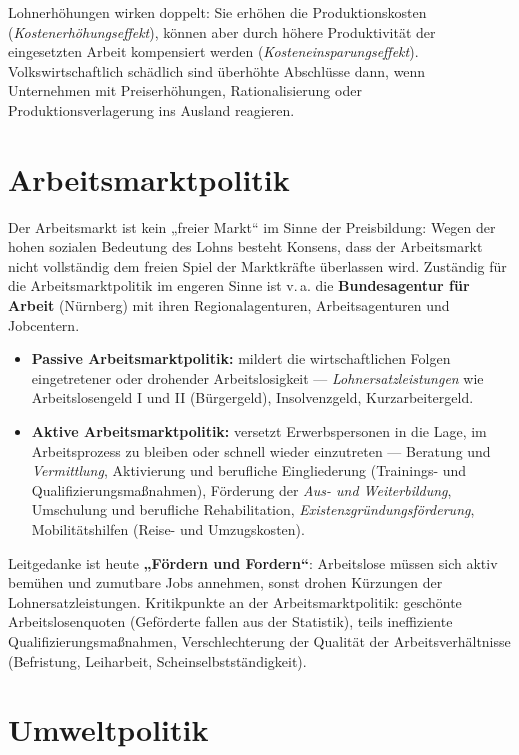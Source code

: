 \documentclass[11pt, a4paper]{article}
\begin{document}
Lohnerhöhungen wirken doppelt: Sie erhöhen die Produktionskosten
(\emph{Kostenerhöhungseffekt}), können aber durch höhere Produktivität der eingesetzten
Arbeit kompensiert werden (\emph{Kosteneinsparungseffekt}). Volkswirtschaftlich schädlich
sind überhöhte Abschlüsse dann, wenn Unternehmen mit Preiserhöhungen, Rationalisierung oder
Produktionsverlagerung ins Ausland reagieren.

\section{Arbeitsmarktpolitik}

Der Arbeitsmarkt ist kein „freier Markt`` im Sinne der Preisbildung: Wegen der hohen
sozialen Bedeutung des Lohns besteht Konsens, dass der Arbeitsmarkt nicht vollständig dem
freien Spiel der Marktkräfte überlassen wird. Zuständig für die Arbeitsmarktpolitik im
engeren Sinne ist v.\,a. die \textbf{Bundesagentur für Arbeit} (Nürnberg) mit ihren
Regionalagenturen, Arbeitsagenturen und Jobcentern.

\begin{itemize}
  \item \textbf{Passive Arbeitsmarktpolitik:} mildert die wirtschaftlichen Folgen
    eingetretener oder drohender Arbeitslosigkeit --- \emph{Lohnersatzleistungen} wie
    Arbeitslosengeld I und II (Bürgergeld), Insolvenzgeld, Kurzarbeitergeld.
  \item \textbf{Aktive Arbeitsmarktpolitik:} versetzt Erwerbspersonen in die Lage, im
    Arbeitsprozess zu bleiben oder schnell wieder einzutreten --- Beratung und
    \emph{Vermittlung}, Aktivierung und berufliche Eingliederung (Trainings- und
    Qualifizierungsmaßnahmen), Förderung der \emph{Aus- und Weiterbildung}, Umschulung und
    berufliche Rehabilitation, \emph{Existenzgründungsförderung}, Mobilitätshilfen (Reise-
    und Umzugskosten).
\end{itemize}

Leitgedanke ist heute \textbf{„Fördern und Fordern``}: Arbeitslose müssen sich aktiv
bemühen und zumutbare Jobs annehmen, sonst drohen Kürzungen der Lohnersatzleistungen.
Kritikpunkte an der Arbeitsmarktpolitik: geschönte Arbeitslosenquoten (Geförderte fallen
aus der Statistik), teils ineffiziente Qualifizierungsmaßnahmen, Verschlechterung der
Qualität der Arbeitsverhältnisse (Befristung, Leiharbeit, Scheinselbstständigkeit).

\section{Umweltpolitik}
\end{document}
